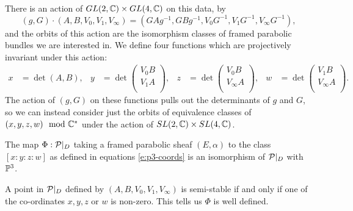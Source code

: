 	There is an action of $GL(2,\mathbb{C})\times GL(4,\mathbb{C})$ on this data, by
	\begin{equation}
		\label{e:p3-action}
		(g,G)\cdot (A,B,V_0,V_1,V_\infty) = (GAg^{-1}, GBg^{-1}, V_0G^{-1}, V_1G^{-1}, V_\infty G^{-1}),
	\end{equation}
	and the orbits of this action are the isomorphism classes of framed parabolic bundles we are interested in. We define four functions which are projectively invariant under this action:
	\begin{align}
		\label{e:p3-coords}
		x&=\det(A,B),& y&=\det\begin{pmatrix}
		V_0 B\\
		V_1 A\\
		\end{pmatrix}, & z&= \det\begin{pmatrix}
		V_0 B\\
		V_\infty A\\
		\end{pmatrix}, & w&= \det\begin{pmatrix}
		V_1 B\\
		V_\infty A\\
		\end{pmatrix}.
	\end{align}
	The action of $(g,G)$ on these functions pulls out the determinants of $g$ and $G$, so we can instead consider just the orbits of equivalence classes of $(x,y,z,w) \mod {\mathbb{C}}^\ast$ under the action of $SL(2,\mathbb{C})\times SL(4,\mathbb{C})$. 
	\begin{theorem}
		\label{t:p3-iso}
		The map $\Phi:\mathcal{P}|_D$ taking a framed parabolic sheaf $(E,\alpha)$ to the class $[x:y:z:w]$ as defined in equations \ref{e:p3-coords} is an isomorphism of $\mathcal{P}|_D$ with $\mathbb{P}^3$. 
	\end{theorem}
	\begin{lemma}
		A point in $\mathcal{P}|_D$ defined by $(A,B,V_0,V_1,V_\infty)$ is semi-stable if and only if one of the co-ordinates $x,y,z$ or $w$ is non-zero. This tells us $\Phi$ is well defined.
	\end{lemma}
